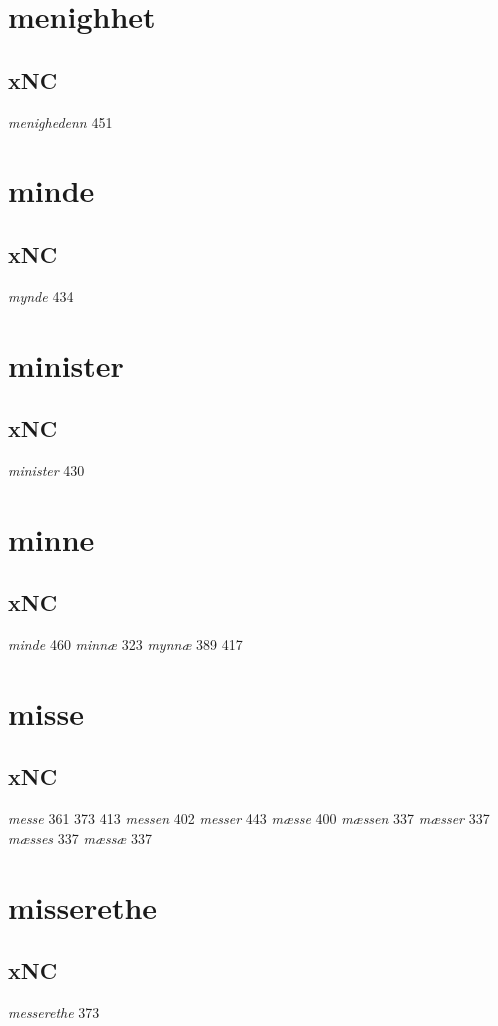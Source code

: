 \documentclass[a4paper,twocolumn]{article}
\begin{document}
\section{menighhet}
\label{sec:org18958c9}
\subsection{xNC}
\label{sec:org71c271a}
\emph{menighedenn} 451 
\section{minde}
\label{sec:org51205c9}
\subsection{xNC}
\label{sec:org06d5be5}
\emph{mynde} 434 
\section{minister}
\label{sec:orgcd05eaa}
\subsection{xNC}
\label{sec:org5cb1b6a}
\emph{minister} 430 
\section{minne}
\label{sec:org7efa957}
\subsection{xNC}
\label{sec:orgfa1aca8}
\emph{minde} 460 \emph{minnæ} 323 \emph{mynnæ} 389 417 
\section{misse}
\label{sec:org5242109}
\subsection{xNC}
\label{sec:orgf109793}
\emph{messe} 361 373 413 \emph{messen} 402 \emph{messer} 443 \emph{mæsse} 400 \emph{mæssen} 337 \emph{mæsser} 337 \emph{mæsses} 337 \emph{mæssæ} 337 
\section{misserethe}
\label{sec:orgb5323a8}
\subsection{xNC}
\label{sec:org5cf43f2}
\emph{messerethe} 373 
\end{document}
